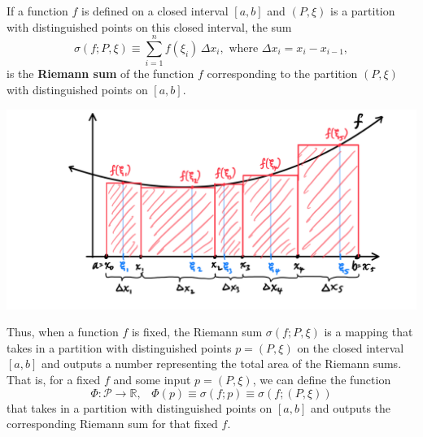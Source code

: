     \begin{definition}
      If a function $f$ is defined on a closed interval $[a, b]$ and $(P, \xi)$ is a partition with distinguished points on this closed interval, the sum
      \[\sigma(f; P, \xi) \equiv \sum_{i=1}^n f(\xi_i)\, \Delta x_i, \text{ where } \Delta x_i = x_i - x_{i-1},\]
      is the \textbf{Riemann sum} of the function $f$ corresponding to the partition $(P, \xi)$ with distinguished points on $[a, b]$. 
      \begin{center}
          \includegraphics[scale=0.25]{img/Riemann_Sum_with_Partitions_Points.PNG}
      \end{center}
      Thus, when a function $f$ is fixed, the Riemann sum $\sigma (f; P, \xi)$ is a mapping that takes in a partition with distinguished points $p = (P, \xi)$ on the closed interval $[a, b]$ and outputs a number representing the total area of the Riemann sums. That is, for a fixed $f$ and some input $p = (P, \xi)$, we can define the function 
      \[\Phi: \mathcal{P} \longrightarrow \mathbb{R}, \;\;\; \Phi(p) \equiv \sigma(f; p) \equiv \sigma(f; (P, \xi))\]
      that takes in a partition with distinguished points on $[a,b]$ and outputs the corresponding Riemann sum for that fixed $f$. 
    \end{definition}

